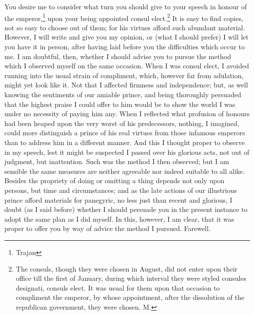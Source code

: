 
You desire me to consider what turn you should give to your speech in
honour of the emperor,\footnote{Trajan} upon your being appointed consul elect.\footnote{The consuls, though they
were chosen in August, did not enter upon their office till the first of
January, during which interval they were styled consules designati,
consuls elect. It was usual for them upon that occasion to compliment the
emperor, by whose appointment, after the dissolution of the republican
government, they were chosen. M.} It
is easy to find copies, not so easy to choose out of them; for his virtues
afford such abundant material. However, I will write and give you my
opinion, or (what I should prefer) I will let you have it in person, after
having laid before you the difficulties which occur to me. I am doubtful,
then, whether I should advise you to pursue the method which I observed
myself on the same occasion. When I was consul elect, I avoided running
into the usual strain of compliment, which, however far from adulation,
might yet look like it. Not that I affected firmness and independence;
but, as well knowing the sentiments of our amiable prince, and being
thoroughly persuaded that the highest praise I could offer to him would be
to show the world I was under no necessity of paying him any. When I
reflected what profusion of honours had been heaped upon the very worst of
his predecessors, nothing, I imagined, could more distinguish a prince of
his real virtues from those infamous emperors than to address him in a
different manner. And this I thought proper to observe in my speech, lest
it might be suspected I passed over his glorious acts, not out of
judgment, but inattention. Such was the method I then observed; but I am
sensible the same measures are neither agreeable nor indeed suitable to
all alike. Besides the propriety of doing or omitting a thing depends not
only upon persons, but time and circumstances; and as the late actions of
our illustrious prince afford materials for panegyric, no less just than
recent and glorious, I doubt (as I said before) whether I should persuade
you in the present instance to adopt the same plan as I did myself. In
this, however, I am clear, that it was proper to offer you by way of
advice the method I pursued. Farewell.


